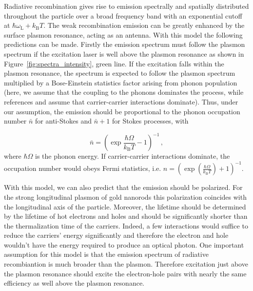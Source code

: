 \documentclass[journal=nalefd,manuscript=letter]{achemso}
\newcommand{\HI}[1]{{#1}} %
\begin{document}
Radiative recombination gives rise to emission spectrally and
spatially distributed throughout the particle over a broad frequency band with
an exponential cutoff at $\hbar\omega_\textrm{L}+k_\textrm{B}T$. The weak
recombination emission can be greatly enhanced by the surface plasmon resonance,
acting as an antenna. 
With this model the following predictions can be made.
Firstly the emission spectrum must follow the plasmon spectrum if the excitation
laser is well above the plasmon resonance as shown in \mbox{Figure
\ref{fig:spectra_intensity}}, \HI{green line}. If the excitation falls within the
plasmon resonance, the spectrum is expected to follow the plasmon spectrum
multiplied by a Bose-Einstein statistics factor arising from phonon population
\HI{(here, we assume that the coupling to the phonons dominates the process, while references
\cite{Huang2014} and \cite{mertens2017light} assume that carrier-carrier interactions dominate).
Thus, under our assumption, the emission} should be proportional to the \HI{phonon occupation} number $\bar{n}$ 
for anti-Stokes and $\bar{n}+1$ for Stokes processes, with

\begin{equation}\label{eqn:BE}
	\bar{n}=\left(\exp\frac{\hbar\Omega}{k_\textrm{B}T}-1\right)^{-1}\,,
\end{equation}
\HI{where $\hbar\Omega$ is the phonon energy. If 
carrier-carrier interactions dominate, the occupation number would obeys Fermi statistics, 
i.e. $n=\left(\exp(\frac{\hbar \Omega}{k_\textrm{B}T})+1 \right)^{-1}$\cite{Huang2014,mertens2017light}.} 

With this model, we can also predict that the emission should be polarized. 
For the strong longitudinal plasmon of gold nanorods this polarization coincides with
the longitudinal axis of the particle\cite{He2015}. Moreover, the lifetime
should be determined by the lifetime of hot electrons and holes and should be
significantly shorter than the thermalization time of the carriers. 
Indeed, a few interactions would suffice to reduce the carriers' energy significantly
and therefore the electron and hole wouldn't have the energy required to produce an
optical photon. 
One important assumption for this model is that the emission spectrum
of radiative recombiantion is much broader than the plasmon. 
Therefore excitation \HI{just} above the plasmon resonance should excite the 
electron-hole pairs with nearly the same efficiency as well above the plasmon
resonance\cite{Cheng2015,mertens2017light}. 
\end{document}
